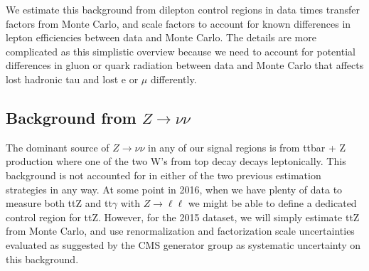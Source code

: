 We estimate this background from dilepton control regions in data times transfer factors from Monte Carlo, and scale factors to account
for known differences in lepton efficiencies between data and Monte Carlo. 
The details are more complicated as this simplistic overview because we need to account for potential differences in 
gluon or quark radiation between data and Monte Carlo that affects lost hadronic tau and lost e or $\mu$ differently.

\subsection{Background from \texorpdfstring{$Z\to\nu\nu$}{Znunu}}

The dominant source of $Z\to\nu\nu$ in any of our signal regions is from ttbar + Z production where one of the two W's from top decay
decays leptonically. This background is not accounted for in either of the two previous estimation strategies in any way.
At some point in 2016, when we have plenty of data to measure both ttZ and tt$\gamma$ with $Z\to \ell\ell$ we might be able to define
a dedicated control region for ttZ. However, for the 2015 dataset, we will simply estimate ttZ from Monte Carlo, and use renormalization 
and factorization scale uncertainties evaluated as suggested by the CMS generator group as systematic uncertainty on this background.




